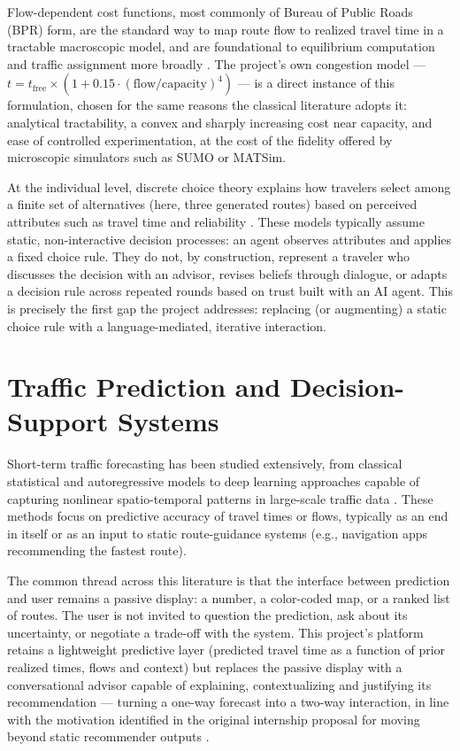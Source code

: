 \documentclass[11pt]{article}
\begin{document}
Flow-dependent cost functions, most commonly of Bureau of Public Roads (BPR) form, are the standard way to map route flow to realized travel time in a tractable macroscopic model, and are foundational to equilibrium computation and traffic assignment more broadly \citep{sheffi1985}. The project's own congestion model --- $t = t_{\text{free}} \times (1 + 0.15 \cdot (\text{flow}/\text{capacity})^4)$ --- is a direct instance of this formulation, chosen for the same reasons the classical literature adopts it: analytical tractability, a convex and sharply increasing cost near capacity, and ease of controlled experimentation, at the cost of the fidelity offered by microscopic simulators such as SUMO or MATSim.

At the individual level, discrete choice theory explains how travelers select among a finite set of alternatives (here, three generated routes) based on perceived attributes such as travel time and reliability \citep{benakiva1999}. These models typically assume static, non-interactive decision processes: an agent observes attributes and applies a fixed choice rule. They do not, by construction, represent a traveler who discusses the decision with an advisor, revises beliefs through dialogue, or adapts a decision rule across repeated rounds based on trust built with an AI agent. This is precisely the first gap the project addresses: replacing (or augmenting) a static choice rule with a language-mediated, iterative interaction.

\section{Traffic Prediction and Decision-Support Systems}
Short-term traffic forecasting has been studied extensively, from classical statistical and autoregressive models to deep learning approaches capable of capturing nonlinear spatio-temporal patterns in large-scale traffic data \citep{vlahogianni2014, lv2015}. These methods focus on predictive accuracy of travel times or flows, typically as an end in itself or as an input to static route-guidance systems (e.g., navigation apps recommending the fastest route).

The common thread across this literature is that the interface between prediction and user remains a passive display: a number, a color-coded map, or a ranked list of routes. The user is not invited to question the prediction, ask about its uncertainty, or negotiate a trade-off with the system. This project's platform retains a lightweight predictive layer (predicted travel time as a function of prior realized times, flows and context) but replaces the passive display with a conversational advisor capable of explaining, contextualizing and justifying its recommendation --- turning a one-way forecast into a two-way interaction, in line with the motivation identified in the original internship proposal for moving beyond static recommender outputs \citep{vlahogianni2014}.
\end{document}

